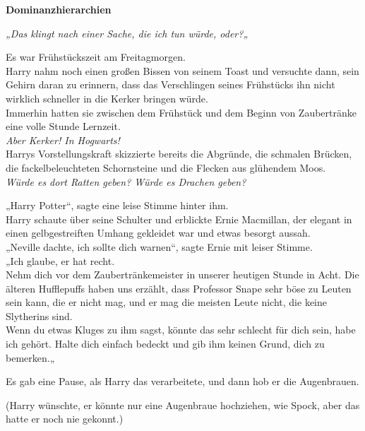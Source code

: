 

\hypertarget{dominanzhierarchien}{%

\textbf{Dominanzhierarchien}\\

\hfill\break

\hfill\break \emph{„Das klingt nach einer Sache, die ich tun würde, oder?„}

Es war Frühstückszeit am Freitagmorgen.\\ Harry nahm noch einen großen Bissen von seinem Toast und versuchte dann, sein Gehirn daran zu erinnern, dass das Verschlingen seines Frühstücks ihn nicht wirklich schneller in die Kerker bringen würde.\\ Immerhin hatten sie zwischen dem Frühstück und dem Beginn von Zaubertränke eine volle Stunde Lernzeit.\\ \emph{Aber Kerker! In Hogwarts!}\\ Harrys Vorstellungskraft skizzierte bereits die Abgründe, die schmalen Brücken, die fackelbeleuchteten Schornsteine und die Flecken aus glühendem Moos.\\ \emph{Würde es dort Ratten geben? Würde es Drachen geben?}

„Harry Potter“, sagte eine leise Stimme hinter ihm.\\ Harry schaute über seine Schulter und erblickte Ernie Macmillan, der elegant in einen gelbgestreiften Umhang gekleidet war und etwas besorgt aussah.\\ „Neville dachte, ich sollte dich warnen“, sagte Ernie mit leiser Stimme.\\ „Ich glaube, er hat recht.\\ Nehm dich vor dem Zaubertränkemeister in unserer heutigen Stunde in Acht. Die älteren Hufflepuffs haben uns erzählt, dass Professor Snape sehr böse zu Leuten sein kann, die er nicht mag, und er mag die meisten Leute nicht, die keine Slytherins sind.\\ Wenn du etwas Kluges zu ihm sagst, könnte das sehr schlecht für dich sein, habe ich gehört. Halte dich einfach bedeckt und gib ihm keinen Grund, dich zu bemerken.„

Es gab eine Pause, als Harry das verarbeitete, und dann hob er die Augenbrauen.

(Harry wünschte, er könnte nur eine Augenbraue hochziehen, wie Spock, aber das hatte er noch nie gekonnt.)

}
